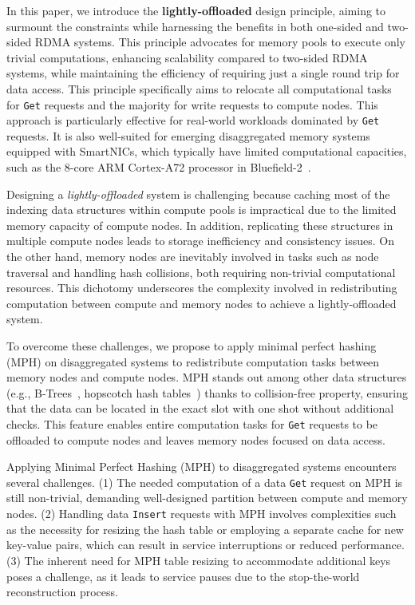 \iffalse
In this paper, we introduce the \textbf{lightly-offloaded} design principle, aiming to surmount the constraints while harnessing the benefits in both one-sided and two-sided RDMA systems. This principle advocates for memory pools to execute only trivial computations, enhancing scalability compared to two-sided RDMA systems, while maintaining the efficiency of requiring just a single round trip for data access. This principle specifically aims to relocate all computational tasks for \texttt{Get} requests and the majority for write requests to compute nodes. This approach is particularly effective for real-world workloads dominated by \texttt{Get} requests. It is also well-suited for emerging disaggregated memory systems equipped with SmartNICs, which typically have limited computational capacities, such as the 8-core ARM Cortex-A72 processor in Bluefield-2~\cite{bluefield}.

Designing a \textit{lightly-offloaded} system is challenging because caching most of the indexing data structures within compute pools is impractical due to the limited memory capacity of compute nodes. In addition, replicating these structures in multiple compute nodes leads to storage inefficiency and consistency issues. On the other hand, memory nodes are inevitably involved in tasks such as node traversal and handling hash collisions, both requiring non-trivial computational resources. This dichotomy underscores the complexity involved in redistributing computation between compute and memory nodes to achieve a lightly-offloaded system.

To overcome these challenges, we propose to apply minimal perfect hashing (MPH) on disaggregated systems to redistribute computation tasks between memory nodes and compute nodes. MPH stands out among other data structures (e.g., B-Trees~\cite{cell,sherman}, hopscotch hash tables~\cite{pilaf,cuckoo}) thanks to collision-free property, ensuring that the data can be located in the exact slot with one shot without additional checks. This feature enables entire computation tasks for \texttt{Get} requests to be offloaded to compute nodes and leaves memory nodes focused on data access.

Applying Minimal Perfect Hashing (MPH) to disaggregated systems encounters several challenges. (1) The needed computation of a data \texttt{Get} request on MPH is still non-trivial, demanding well-designed partition between compute and memory nodes. (2) Handling data \texttt{Insert} requests with MPH involves complexities such as the necessity for resizing the hash table or employing a separate cache for new key-value pairs, which can result in service interruptions or reduced performance. (3) The inherent need for MPH table resizing to accommodate additional keys poses a challenge, as it leads to service pauses due to the stop-the-world reconstruction process.

